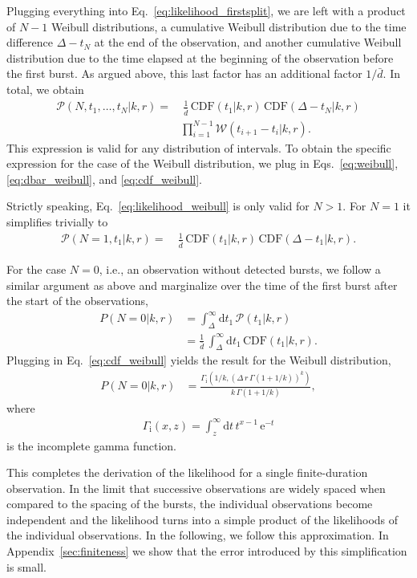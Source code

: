 \documentclass[fleqn,usenatbib]{mnras}
\begin{document}
Plugging everything into Eq.~\eqref{eq:likelihood_firstsplit}, we are left with a product of $N - 1$ Weibull distributions, a cumulative Weibull distribution due to the time difference $\Delta - t_N$ at the end of the observation, and another cumulative Weibull distribution due to the time elapsed at the beginning of the observation before the first burst. As argued above, this last factor has an additional factor $1/\bar{d}$. In total, we obtain
\begin{align}
	\label{eq:likelihood_weibull}
	\mathcal{P}(N,t_1,\dots,t_N|k,r) =& ~\frac{1}{\bar{d}} \, \mathrm{CDF}(t_1|k,r) \, \mathrm{CDF}(\Delta - t_N|k,r)\nonumber\\
	&\prod_{i=1}^{N-1} \mathcal{W}(t_{i+1} - t_i|k,r).
\end{align}
This expression is valid for any distribution of intervals. To obtain the specific expression for the case of the Weibull distribution, we plug in Eqs.~\eqref{eq:weibull}, \eqref{eq:dbar_weibull}, and \eqref{eq:cdf_weibull}.

Strictly speaking, Eq.~\eqref{eq:likelihood_weibull} is only valid for $N > 1$. For $N = 1$ it simplifies trivially to
\begin{align}
	\label{eq:likelihood_N1}
	\mathcal{P}(N=1,t_1|k,r) =& ~\frac{1}{\bar{d}} \, \mathrm{CDF}(t_1|k,r) \, \mathrm{CDF}(\Delta - t_1|k,r).
\end{align}

For the case $N=0$, i.e., an observation without detected bursts, we follow a similar argument as above and marginalize over the time of the first burst after the start of the observations,
\begin{align}
	P(N=0|k,r) &= \int_\Delta^\infty \mathrm{d}t_1 \, \mathcal{P}(t_1|k,r)\nonumber\\
	&= \frac{1}{\bar{d}} \, \int_\Delta^\infty \mathrm{d}t_1 \, \mathrm{CDF}(t_1|k,r).
\end{align}
Plugging in Eq.~\eqref{eq:cdf_weibull} yields the result for the Weibull distribution,
\begin{align}
	\label{eq:likelihood_N0}
	P(N=0|k,r) &= \frac{\Gamma_\mathrm{i}{\left(1/k, \left(\Delta\,r\,\Gamma(1+1/k)\right)^k\right)}}{k\,\Gamma{\left(1+1/k\right)}},
\end{align}
where
\begin{align}
	\Gamma_\mathrm{i}(x,z) = \int_z^\infty \mathrm{d}t \, t^{x-1} \, \mathrm{e}^{-t}
\end{align}
is the incomplete gamma function.

This completes the derivation of the likelihood for a single finite-duration observation. In the limit that successive observations are widely spaced when compared to the spacing of the bursts, the individual observations become independent and the likelihood turns into a simple product of the likelihoods of the individual observations. In the following, we follow this approximation. In Appendix~\ref{sec:finiteness} we show that the error introduced by this simplification is small.
\end{document}
